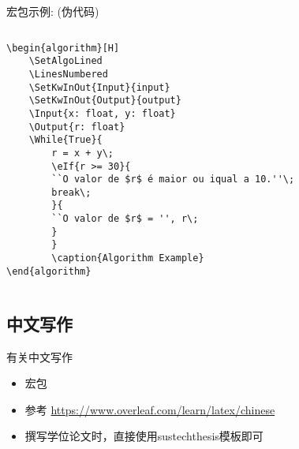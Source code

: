 \begin{frame}[fragile]{宏包示例:  (伪代码)}
	\begin{columns}
		\begin{column}{.6\textwidth}
			\lstset{language=[LaTeX]TeX}
			\begin{lstlisting}[basicstyle=\ttfamily\footnotesize]
\begin{algorithm}[H]
    \SetAlgoLined
    \LinesNumbered
    \SetKwInOut{Input}{input}
    \SetKwInOut{Output}{output}
    \Input{x: float, y: float}
    \Output{r: float}
    \While{True}{
        r = x + y\;
        \eIf{r >= 30}{
        ``O valor de $r$ é maior ou iqual a 10.''\;
        break\;
        }{
        ``O valor de $r$ = '', r\;
        }
        } 
        \caption{Algorithm Example}
\end{algorithm}\end{lstlisting}
		\end{column}
		\begin{column}{.4\textwidth}
			\begin{algorithm}[H]
				\SetAlgoLined
				\LinesNumbered
				\caption{Algorithm Example}
			\end{algorithm}
		\end{column}
	\end{columns}
\end{frame}

\subsection{中文写作}
\begin{frame}{有关中文写作}
	\begin{itemize}
		\item 宏包 
		\item 参考 \url{https://www.overleaf.com/learn/latex/chinese}
		\item 撰写学位论文时，直接使用sustechthesis模板即可
	\end{itemize}
\end{frame}

